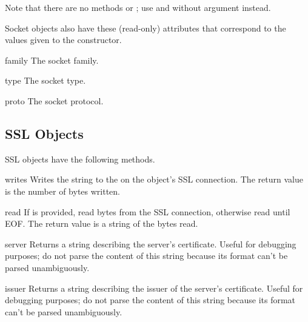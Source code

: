 Note that there are no methods  or ;
use  and  without  argument
instead.


Socket objects also have these (read-only) attributes that correspond
to the values given to the  constructor.

\begin{memberdesc}[socket]{family}
The socket family.
\end{memberdesc}

\begin{memberdesc}[socket]{type}
The socket type.
\end{memberdesc}

\begin{memberdesc}[socket]{proto}
The socket protocol.
\end{memberdesc}


\subsection{SSL Objects \label{ssl-objects}}

SSL objects have the following methods.

\begin{methoddesc}{write}{s}
Writes the string  to the on the object's SSL connection.
The return value is the number of bytes written.
\end{methoddesc}

\begin{methoddesc}{read}{}
If  is provided, read  bytes from the SSL connection, otherwise
read until EOF. The return value is a string of the bytes read.
\end{methoddesc}

\begin{methoddesc}{server}{}
Returns a string describing the server's certificate.
Useful for debugging purposes; do not parse the content of this string
because its format can't be parsed unambiguously.
\end{methoddesc}

\begin{methoddesc}{issuer}{}
Returns a string describing the issuer of the server's certificate.
Useful for debugging purposes; do not parse the content of this string
because its format can't be parsed unambiguously.
\end{methoddesc}

